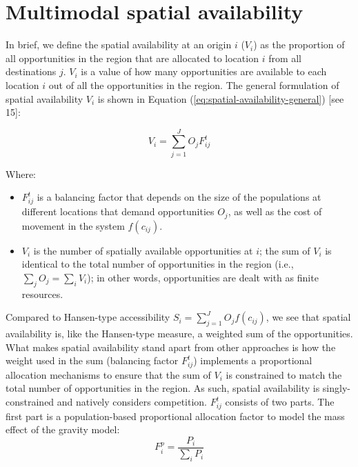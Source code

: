 \documentclass[10pt,letterpaper]{article}
\begin{document}
\hypertarget{multimodal-spatial-availability}{%
\section{Multimodal spatial
availability}\label{multimodal-spatial-availability}}

In brief, we define the spatial availability at an origin \(i\)
(\(V_{i}\)) as the proportion of all opportunities in the region that
are allocated to location \(i\) from all destinations \(j\). \(V_{i}\)
is a value of how many opportunities are available to each location
\(i\) out of all the opportunities in the region. The general
formulation of spatial availability \(V_{i}\) is shown in Equation
(\ref{eq:spatial-availability-general}) {[}see 15{]}:

\begin{equation}
\label{eq:spatial-availability-general}
V_i = \sum_{j=1}^J O_jF^t_{ij}
\end{equation}

\noindent Where:

\begin{itemize}
\item
  \(F^t_{ij}\) is a balancing factor that depends on the size of the
  populations at different locations that demand opportunities \(O_j\),
  as well as the cost of movement in the system \(f(c_{ij})\).
\item
  \(V_i\) is the number of spatially available opportunities at \(i\);
  the sum of \(V_{i}\) is identical to the total number of opportunities
  in the region (i.e., \(\sum_j O_j = \sum_i V_i\)); in other words,
  opportunities are dealt with as finite resources.
\end{itemize}

Compared to Hansen-type accessibility
\(S_i = \sum_{j=1}^J O_jf(c_{ij})\), we see that spatial availability
is, like the Hansen-type measure, a weighted sum of the opportunities.
What makes spatial availability stand apart from other approaches is how
the weight used in the sum (balancing factor \(F^t_{ij}\)) implements a
proportional allocation mechanisms to ensure that the sum of \(V_i\) is
constrained to match the total number of opportunities in the region. As
such, spatial availability is singly-constrained and natively considers
competition. \(F^t_{ij}\) consists of two parts. The first part is a
population-based proportional allocation factor to model the mass effect
of the gravity model: \[
F^p_{i} = \frac{P_i}{\sum_i P_i}
\]
\end{document}
